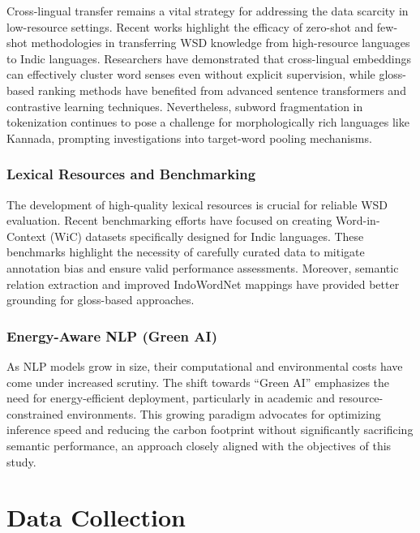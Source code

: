\documentclass[12pt,a4paper,oneside]{article}
\begin{document}
Cross-lingual transfer remains a vital strategy for addressing the data scarcity in low-resource settings. Recent works highlight the efficacy of zero-shot and few-shot methodologies in transferring WSD knowledge from high-resource languages to Indic languages. Researchers have demonstrated that cross-lingual embeddings can effectively cluster word senses even without explicit supervision, while gloss-based ranking methods have benefited from advanced sentence transformers and contrastive learning techniques. Nevertheless, subword fragmentation in tokenization continues to pose a challenge for morphologically rich languages like Kannada, prompting investigations into target-word pooling mechanisms.

\subsubsection{Lexical Resources and Benchmarking}

The development of high-quality lexical resources is crucial for reliable WSD evaluation. Recent benchmarking efforts have focused on creating Word-in-Context (WiC) datasets specifically designed for Indic languages. These benchmarks highlight the necessity of carefully curated data to mitigate annotation bias and ensure valid performance assessments. Moreover, semantic relation extraction and improved IndoWordNet mappings have provided better grounding for gloss-based approaches.

\subsubsection{Energy-Aware NLP (Green AI)}

As NLP models grow in size, their computational and environmental costs have come under increased scrutiny. The shift towards ``Green AI'' emphasizes the need for energy-efficient deployment, particularly in academic and resource-constrained environments. This growing paradigm advocates for optimizing inference speed and reducing the carbon footprint without significantly sacrificing semantic performance, an approach closely aligned with the objectives of this study.

\clearpage

\section{Data Collection}
\end{document}
